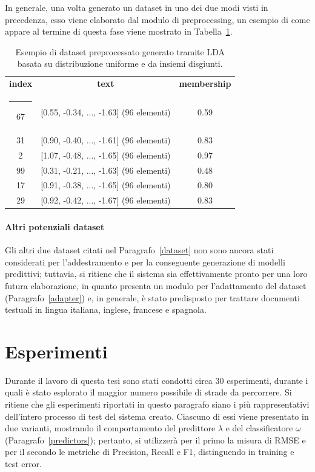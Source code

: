 \documentclass[12pt]{report}
\makeatletter
\theoremstyle{definition}
\newcommand{\thickhline}{%
    \noalign {\ifnum 0=`}\fi \hrule height 1pt
    \futurelet \reserved@a \@xhline
}
\makeatother
\begin{document}
In generale, una volta generato un dataset in uno dei due modi visti in precedenza, esso viene elaborato dal modulo di preprocessing, un esempio di come appare al termine di questa fase viene mostrato in Tabella~\ref{uniformlda}.
\begin{table}
\centering
 \begin{tabular}{|c|c|c|} 
 \hline 
 \textbf{index} & \textbf{text} & \textbf{membership}
\\ [0.5ex] 
 \thickhline
67 & [0.55, -0.34, ..., -1.63] (96 elementi) & 0.59 \\
31 & [0.90, -0.40, ..., -1.61] (96 elementi) & 0.83\\ 
2 & [1.07, -0.48, ..., -1.65] (96 elementi) & 0.97\\
99 & [0.31, -0.21, ..., -1.63] (96 elementi) & 0.48\\
17 & [0.91, -0.38, ..., -1.65] (96 elementi) & 0.80\\
29 & [0.92, -0.42, ..., -1.67] (96 elementi) & 0.83\\
 \hline
\end{tabular}
\caption{Esempio di dataset preprocessato generato tramite LDA basata su distribuzione uniforme e da insiemi disgiunti.}
\label{uniformlda}
\end{table}

\paragraph{Altri potenziali dataset}
Gli altri due dataset citati nel Paragrafo~\ref{dataset} non sono ancora stati considerati per l'addestramento e per la conseguente generazione di modelli predittivi; tuttavia, si ritiene che il sistema sia effettivamente pronto per una loro futura elaborazione, in quanto presenta un modulo per l'adattamento del dataset (Paragrafo~\ref{adapter}) e, in generale, è stato predisposto per trattare documenti testuali in lingua italiana, inglese, francese e spagnola.

\section{Esperimenti}\label{esperimenti}
Durante il lavoro di questa tesi sono stati condotti circa 30 esperimenti, durante i quali è stato esplorato il maggior numero possibile di strade da percorrere. Si ritiene che gli esperimenti riportati in questo paragrafo siano i più rappresentativi dell'intero processo di test del sistema creato. Ciascuno di essi viene presentato in due varianti, mostrando il comportamento del predittore $\lambda$ e del classificatore $\omega$ (Paragrafo~\ref{predictors}); pertanto, si utilizzerà per il primo la misura di RMSE e per il secondo le metriche di Precision, Recall e F1, distinguendo in training e test error. 
\end{document}
